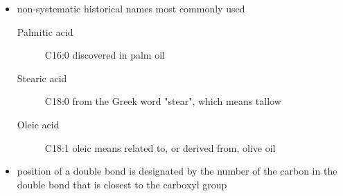 \documentclass{scrartcl}
\begin{document}

\begin{itemize}
\item non-systematic historical names most commonly used
\begin{description}
\item[{Palmitic acid}] C16:0 discovered in palm oil
\item[{Stearic acid}] C18:0 from the Greek word "stear", which means tallow
\item[{Oleic acid}] C18:1 oleic means related to, or derived from, olive oil
\end{description}
\item position of a double bond is designated by the number of the carbon in the double bond that is closest to the carboxyl group
\end{itemize}
\end{document}
